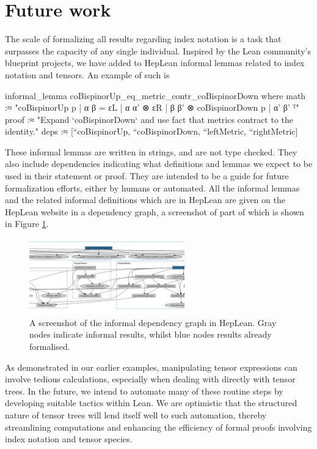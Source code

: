 \documentclass[a4paper, 11pt]{article}
\begin{document}
\section{Future work} \label{sec:future}
The scale of formalizing all results regarding index notation is a task that surpasses 
the capacity of any single individual. Inspired by the Lean community's 
blueprint projects, we have added to HepLean informal lemmas related to index notation and tensors. 
An example of such is 
\begin{code} 
informal_lemma coBispinorUp_eq_metric_contr_coBispinorDown where
  math :≈ "{coBispinorUp p | α β = εL | α α' ⊗ εR | β β' ⊗ coBispinorDown p | α' β' }ᵀ"
  proof :≈ "Expand `coBispinorDown` and use fact that metrics contract to the identity."
  deps :≈ [``coBispinorUp, ``coBispinorDown, ``leftMetric, ``rightMetric]
\end{code}
These informal lemmas are written in strings, and are not type checked.
They also include dependencies indicating what definitions and lemmas we expect to be used in their statement or proof.
They are intended to be a guide for future formalization efforts, either by humans or 
automated. All the informal lemmas and the related informal definitions which are in HepLean are 
given on the HepLean website in a dependency graph, a screenshot of part of which is shown in Figure \ref{fig:informalLemmas}.
\begin{figure}
  \centering
  \includegraphics[width=0.6\textwidth]{informalLemmas.png}
  \caption{A screenshot of the informal dependency graph in HepLean. Gray nodes indicate informal results, whilst 
  blue nodes results already formalised.}
  \label{fig:informalLemmas}
\end{figure}

As demonstrated in our earlier examples, manipulating tensor expressions can involve tedious
 calculations, especially when dealing with directly with tensor trees. 
In the future, we intend to automate many of these routine steps by developing suitable tactics 
within Lean. We are optimistic that the structured nature of tensor trees will lend itself well to 
such automation, thereby streamlining computations and enhancing the efficiency of formal proofs
involving index notation and tensor species.
\end{document}
